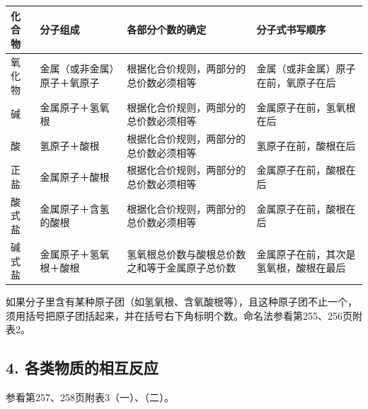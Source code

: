 {\def\LTcaptype{none} %
\begin{longtable}[]{@{}
  >{\raggedright\arraybackslash}p{}
  >{\raggedright\arraybackslash}p{}
  >{\raggedright\arraybackslash}p{}
  >{\raggedright\arraybackslash}p{}@{}}
\toprule\noalign{}
\begin{minipage}[b]{\linewidth}\raggedright
化合物
\end{minipage} & \begin{minipage}[b]{\linewidth}\raggedright
分子组成
\end{minipage} & \begin{minipage}[b]{\linewidth}\raggedright
各部分个数的确定
\end{minipage} & \begin{minipage}[b]{\linewidth}\raggedright
分子式书写顺序
\end{minipage} \\
\midrule\noalign{}
\endhead
\bottomrule\noalign{}
\endlastfoot
氧化物 & 金属（或非金属）原子＋氧原子 &
根据化合价规则，两部分的总价数必须相等 &
金属（或非金属）原子在前，氧原子在后 \\
碱 & 金属原子＋氢氧根 & 根据化合价规则，两部分的总价数必须相等 &
金属原子在前，氢氧根在后 \\
酸 & 氢原子＋酸根 & 根据化合价规则，两部分的总价数必须相等 &
氢原子在前，酸根在后 \\
正盐 & 金属原子＋酸根 & 根据化合价规则，两部分的总价数必须相等 &
金属原子在前，酸根在后 \\
酸式盐 & 金属原子＋含氢的酸根 & 根据化合价规则，两部分的总价数必须相等 &
金属原子在前，酸根在后 \\
碱式盐 & 金属原子＋氢氧根＋酸根 &
氢氧根总价数与酸根总价数之和等于金属原子总价数 &
金属原子在前，其次是氢氧根，酸根在最后 \\
\end{longtable}
}

如果分子里含有某种原子团（如氢氧根、含氧酸根等），且这种原子团不止一个，须用括号把原子团括起来，并在括号右下角标明个数。命名法参看第255、256页附表2。

\subsection{4. 各类物质的相互反应}

参看第257、258页附表3（一）、（二）。

